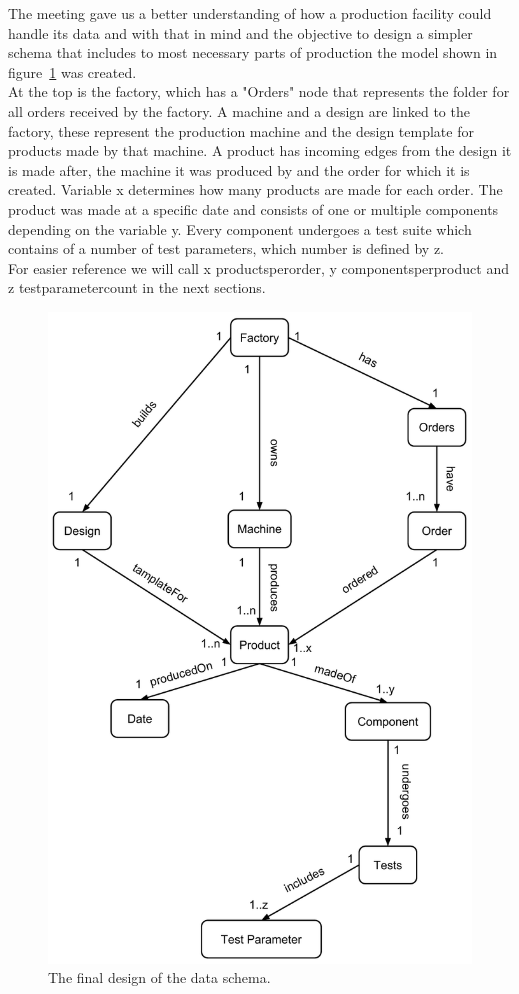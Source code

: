 The meeting gave us a better understanding of how a production facility could handle its data and with that in mind and the objective to design a simpler schema that includes to most necessary parts of production the model shown in figure~\ref{fig:finalDesignOfSchema} was created. \\
At the top is the factory,
which has a "Orders" node that represents the folder for all orders received by the factory.
A machine and a design are linked to the factory,
these represent the production machine and the design template for products made by that machine.
A product has incoming edges from the design it is made after, the machine it was produced by and the order for which it is created.
Variable x determines how many products are made for each order.
The product was made at a specific date and consists of one or multiple components depending on the variable y.
Every component undergoes a test suite which contains of a number of test parameters,
which number is defined by z.\\
For easier reference we will call x productsperorder, y componentsperproduct and z testparametercount in the next sections.

\begin{figure}
  \centering
  \includegraphics[width=.75\textwidth]{images/design/dataStructure}
  \caption{The final design of the data schema.}
  \label{fig:finalDesignOfSchema}
\end{figure}

